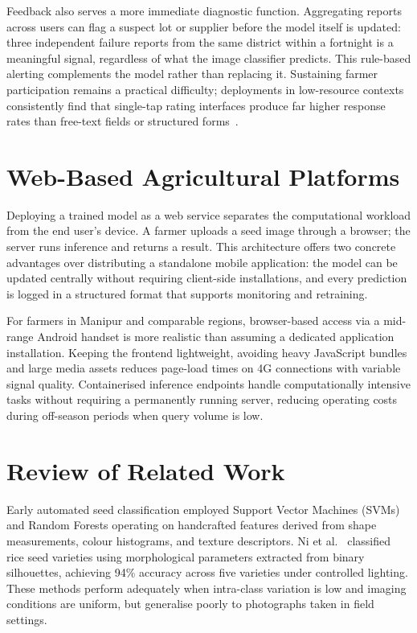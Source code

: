 Feedback also serves a more immediate diagnostic function. Aggregating reports across users can flag a suspect lot or supplier before the model itself is updated: three independent failure reports from the same district within a fortnight is a meaningful signal, regardless of what the image classifier predicts. This rule-based alerting complements the model rather than replacing it. Sustaining farmer participation remains a practical difficulty; deployments in low-resource contexts consistently find that single-tap rating interfaces produce far higher response rates than free-text fields or structured forms~\cite{munoz2018ict}.

\section{Web-Based Agricultural Platforms}

Deploying a trained model as a web service separates the computational workload from the end user's device. A farmer uploads a seed image through a browser; the server runs inference and returns a result. This architecture offers two concrete advantages over distributing a standalone mobile application: the model can be updated centrally without requiring client-side installations, and every prediction is logged in a structured format that supports monitoring and retraining.

For farmers in Manipur and comparable regions, browser-based access via a mid-range Android handset is more realistic than assuming a dedicated application installation. Keeping the frontend lightweight, avoiding heavy JavaScript bundles and large media assets reduces page-load times on 4G connections with variable signal quality. Containerised inference endpoints handle computationally intensive tasks without requiring a permanently running server, reducing operating costs during off-season periods when query volume is low.

\section{Review of Related Work}

Early automated seed classification employed Support Vector Machines (SVMs) and Random Forests operating on handcrafted features derived from shape measurements, colour histograms, and texture descriptors. Ni et al.~\cite{ni2009} classified rice seed varieties using morphological parameters extracted from binary silhouettes, achieving 94\% accuracy across five varieties under controlled lighting. These methods perform adequately when intra-class variation is low and imaging conditions are uniform, but generalise poorly to photographs taken in field settings.

